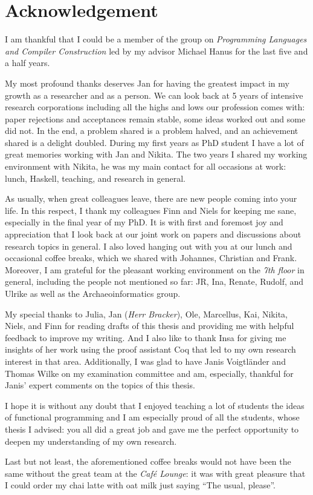 %
\chapter*{Acknowledgement}
\label{sec:acknowledgement}
\vspace*{-10mm}

I am thankful that I could be a member of the group on \emph{Programming Languages and Compiler Construction} led by my advisor Michael Hanus for the last five and a half years.

My most profound thanks deserves Jan for having the greatest impact in my growth as a researcher and as a person.
We can look back at 5 years of intensive research corporations including all the highs and lows our profession comes with: paper rejections and acceptances remain stable, some ideas worked out and some did not.
In the end, a problem shared is a problem halved, and an achievement shared is a delight doubled.
During my first years as PhD student I have a lot of great memories working with Jan and Nikita.
The two years I shared my working environment with Nikita, he was my main contact for all occasions at work: lunch, Haskell, teaching, and research in general.

As usually, when great colleagues leave, there are new people coming into your life.
In this respect, I thank my colleagues Finn and Niels for keeping me sane, especially in the final year of my PhD.
It is with first and foremost joy and appreciation that I look back at our joint work on papers and discussions about research topics in general.
I also loved hanging out with you at our lunch and occasional coffee breaks, which we shared with Johannes, Christian and Frank.
Moreover, I am grateful for the pleasant working environment on the \emph{7th floor} in general, including the people not mentioned so far: JR, Ina, Renate, Rudolf, and Ulrike as well as the Archaeoinformatics group.

My special thanks to Julia, Jan (\emph{Herr Bracker}), Ole, Marcellus, Kai, Nikita, Niels, and Finn for reading drafts of this thesis and providing me with helpful feedback to improve my writing.
And I also like to thank Insa for giving me insights of her work using the proof assistant Coq that led to my own research interest in that area.
Additionally, I was glad to have Janis Voigtl\"ander and Thomas Wilke on my examination committee and am, especially, thankful for Janis' expert comments on the topics of this thesis.

I hope it is without any doubt that I enjoyed teaching a lot of students the ideas of functional programming and I am especially proud of all the students, whose thesis I advised: you all did a great job and gave me the perfect opportunity to deepen my understanding of my own research.

Last but not least, the aforementioned coffee breaks would not have been the same without the great team at the \emph{Caf\'e Lounge}: it was with great pleasure that I could order my chai latte with oat milk just saying ``The usual, please''.